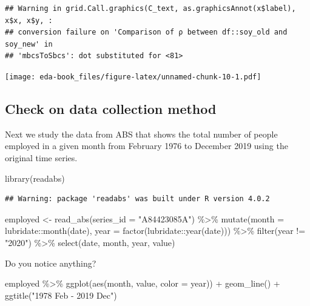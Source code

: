 \documentclass[
]{book}
\newenvironment{Shaded}{\begin{snugshade}}{\end{snugshade}}
\newcommand{\AttributeTok}[1]{\textcolor[rgb]{0.77,0.63,0.00}{#1}}
\newcommand{\FunctionTok}[1]{\textcolor[rgb]{0.00,0.00,0.00}{#1}}
\newcommand{\NormalTok}[1]{#1}
\newcommand{\OtherTok}[1]{\textcolor[rgb]{0.56,0.35,0.01}{#1}}
\newcommand{\SpecialCharTok}[1]{\textcolor[rgb]{0.00,0.00,0.00}{#1}}
\newcommand{\StringTok}[1]{\textcolor[rgb]{0.31,0.60,0.02}{#1}}
\begin{document}
\begin{verbatim}
## Warning in grid.Call.graphics(C_text, as.graphicsAnnot(x$label), x$x, x$y, :
## conversion failure on 'Comparison of ρ between df::soy_old and soy_new' in
## 'mbcsToSbcs': dot substituted for <81>
\end{verbatim}

\texttt{[image: eda-book\_files/figure-latex/unnamed-chunk-10-1.pdf]}

\hypertarget{check-on-data-collection-method}{%
\subsection{Check on data collection method}\label{check-on-data-collection-method}}

Next we study the data from ABS that shows the total number of people employed in a given month from February 1976 to December 2019 using the original time series.

\begin{Shaded}
\begin{Highlighting}[]
\FunctionTok{library}\NormalTok{(readabs)}
\end{Highlighting}
\end{Shaded}

\begin{verbatim}
## Warning: package 'readabs' was built under R version 4.0.2
\end{verbatim}

\begin{Shaded}
\begin{Highlighting}[]
\NormalTok{employed }\OtherTok{\textless{}{-}} \FunctionTok{read\_abs}\NormalTok{(}\AttributeTok{series\_id =} \StringTok{"A84423085A"}\NormalTok{) }\SpecialCharTok{\%\textgreater{}\%} 
  \FunctionTok{mutate}\NormalTok{(}\AttributeTok{month =}\NormalTok{ lubridate}\SpecialCharTok{::}\FunctionTok{month}\NormalTok{(date),}
         \AttributeTok{year =} \FunctionTok{factor}\NormalTok{(lubridate}\SpecialCharTok{::}\FunctionTok{year}\NormalTok{(date))) }\SpecialCharTok{\%\textgreater{}\%} 
  \FunctionTok{filter}\NormalTok{(year }\SpecialCharTok{!=} \StringTok{"2020"}\NormalTok{) }\SpecialCharTok{\%\textgreater{}\%} 
  \FunctionTok{select}\NormalTok{(date, month, year, value) }
\end{Highlighting}
\end{Shaded}

Do you notice anything?

\begin{Shaded}
\begin{Highlighting}[]
\NormalTok{employed  }\SpecialCharTok{\%\textgreater{}\%} 
  \FunctionTok{ggplot}\NormalTok{(}\FunctionTok{aes}\NormalTok{(month, value, }\AttributeTok{color =}\NormalTok{ year)) }\SpecialCharTok{+} 
  \FunctionTok{geom\_line}\NormalTok{() }\SpecialCharTok{+} 
  \FunctionTok{ggtitle}\NormalTok{(}\StringTok{"1978 Feb {-} 2019 Dec"}\NormalTok{) }
\end{Highlighting}
\end{Shaded}
\end{document}
